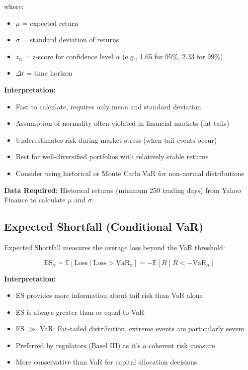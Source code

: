 \documentclass[11pt,a4paper]{article}
\begin{document}
where:
\begin{itemize}
    \item $\mu$ = expected return
    \item $\sigma$ = standard deviation of returns
    \item $z_\alpha$ = z-score for confidence level $\alpha$ (e.g., 1.65 for 95\%, 2.33 for 99\%)
    \item $\Delta t$ = time horizon
\end{itemize}

\textbf{Interpretation:}
\begin{itemize}
    \item Fast to calculate, requires only mean and standard deviation
    \item Assumption of normality often violated in financial markets (fat tails)
    \item Underestimates risk during market stress (when tail events occur)
    \item Best for well-diversified portfolios with relatively stable returns
    \item Consider using historical or Monte Carlo VaR for non-normal distributions
\end{itemize}

\textbf{Data Required:} Historical returns (minimum 250 trading days) from Yahoo Finance to calculate $\mu$ and $\sigma$.

\subsection{Expected Shortfall (Conditional VaR)}

Expected Shortfall measures the average loss beyond the VaR threshold:

\begin{equation}
\text{ES}_\alpha = \mathbb{E}[\text{Loss} \mid \text{Loss} > \text{VaR}_\alpha] = -\mathbb{E}[R \mid R < -\text{VaR}_\alpha]
\end{equation}

\textbf{Interpretation:}
\begin{itemize}
    \item ES provides more information about tail risk than VaR alone
    \item ES is always greater than or equal to VaR
    \item ES $\gg$ VaR: Fat-tailed distribution, extreme events are particularly severe
    \item Preferred by regulators (Basel III) as it's a coherent risk measure
    \item More conservative than VaR for capital allocation decisions
\end{itemize}
\end{document}
